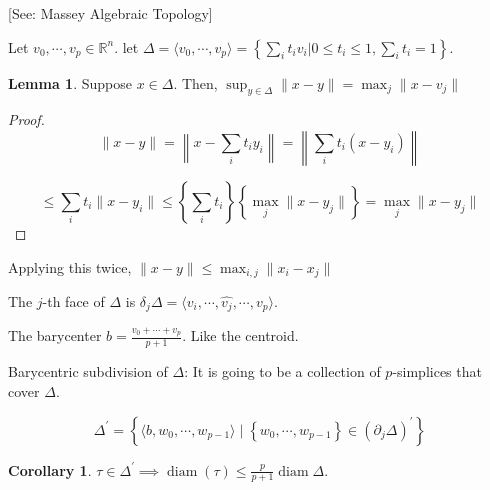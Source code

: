 \documentclass{article}
\theoremstyle{definition}
\newtheorem{lemma}[theorem]{Lemma}
\newtheorem{corollary}[theorem]{Corollary}
\begin{document}
    [See: Massey Algebraic Topology]

    Let \(v_0, \cdots , v_p \in \mathbb{R}^n\). let \(\Delta = \langle v_0, \cdots , v_p \rangle = \left\{ \sum_{i} t_i v_i | 0 \leq t_i \leq 1, \sum_{i} t_i = 1 \right\}\).

    \begin{lemma}
        Suppose \(x\in \Delta\). Then, \(\sup_{y\in \Delta} \lVert x - y \rVert = \max_j \lVert x - v_j \rVert\) 
    \end{lemma}

    \begin{proof}
        \[
            \lVert x - y \rVert = \left\lVert x - \sum_{i} t_i y_i \right\rVert = \left\lVert \sum_{i} t_i (x - y_i) \right\rVert 
        \]

        \[
            \leq \sum_{i} t_i \lVert x - y_i \rVert \leq \left\{ \sum_{i} t_i \right\} \left\{ \max_j \lVert x - y_j \rVert \right\} = \max_j \lVert x - y_j \rVert 
        \]

    \end{proof}

    Applying this twice, \(\lVert x - y \rVert \leq \max_{i,j} \lVert x_i - x_j \rVert\)

    The \(j\)-th face of \(\Delta\) is \(\delta_j \Delta = \langle v_i, \cdots , \widehat{v_j}, \cdots , v_p \rangle\).

    The barycenter \(b = \frac{v_0 + \cdots + v_p}{p+1}\). Like the centroid.

    Barycentric subdivision of \(\Delta\): It is going to be a collection of \(p\)-simplices that cover \(\Delta\).

    \[
        \Delta ^{\prime} = \left\{ \langle b, w_0, \cdots , w_{p-1} \rangle \mid \left\{ w_0, \cdots , w_{p-1} \right\} \in \left( \partial_j \Delta \right)^{\prime} \right\} 
    \]

    \begin{corollary}
        \(\tau \in \Delta^{\prime} \implies \operatorname{diam} (\tau) \leq \frac{p}{p+1} \operatorname{diam} \Delta\).
    \end{corollary}
\end{document}

